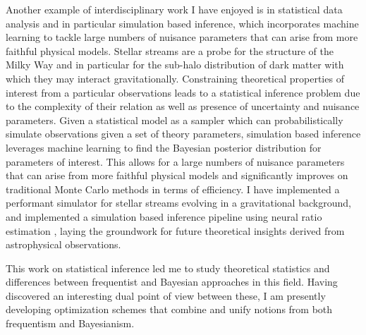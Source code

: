 \documentclass[11pt]{article}
\begin{document}
Another example of interdisciplinary work I have enjoyed is in statistical data analysis and in particular simulation based inference, which incorporates machine learning to tackle large numbers of nuisance parameters that can arise from more faithful physical models.
Stellar streams are a probe for the structure of the Milky Way and in particular for the sub-halo distribution of dark matter with which they may interact gravitationally. Constraining theoretical properties of interest from a particular observations leads to a statistical inference problem due to the complexity of their relation as well as presence of uncertainty and nuisance parameters.
Given a statistical model as a sampler which can probabilistically simulate observations given a set of theory parameters, simulation based inference leverages machine learning to find the Bayesian posterior distribution for parameters of interest.
This allows for a large numbers of nuisance parameters that can arise from more faithful physical models and significantly improves on traditional Monte Carlo methods in terms of efficiency.
I have implemented a performant simulator for stellar streams evolving in a gravitational background, and implemented a simulation based inference pipeline using neural ratio estimation \cite{alvey2023AlbatrossScalable}, laying the groundwork for future theoretical insights derived from astrophysical observations.

This work on statistical inference led me to study theoretical statistics and differences between frequentist and Bayesian approaches in this field.
Having discovered an interesting dual point of view between these, I am presently developing optimization schemes that combine and unify notions from both frequentism and Bayesianism.



{
    \small
    
}
\end{document}
